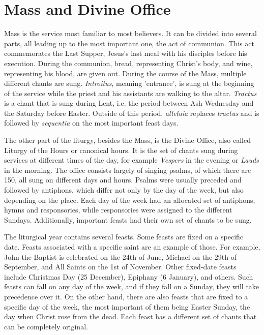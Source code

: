 \section{Mass and Divine Office}

Mass is the service most familiar to most believers.
It can be divided into several parts, all leading up to the most important one, the act of communion. This act commemorates the Last Supper,
Jesus's last meal with his disciples before his execution. During the communion, bread, representing Christ's body, and wine, representing his
blood, are given out. During the course of the Mass, multiple different chants are sung. \emph{Introitus}, meaning 'entrance', is sung at the beginning
of the service while the priest and his assistants are walking to the altar. \emph{Tractus} is a chant that is sung during Lent, i.e. the period
between Ash Wednesday and the Saturday before Easter. Outside of this period, \emph{alleluia} replaces \emph{tractus} and is followed by \emph{sequentia}
on the most important feast days.

The other part of the liturgy, besides the Mass, is the Divine Office, also called Liturgy of the Hours or canonical hours. It is the set of chants
sung during services at different times of the day, for example \emph{Vespers} in the evening or \emph{Lauds} in the morning. The office consists
largely of singing psalms, of which there are 150, all sung on different days and hours. Psalms were usually preceded and followed by antiphons,
which differ not only by the day of the week, but also depending on the place. Each day of the week had an allocated set of antiphons, hymns and
responsories, while responsories were assigned to the different Sundays. Additionally, important feasts had their own set of chants to be sung.

The liturgical year contains several feasts. Some feasts are fixed on a specific date. Feasts associated with a specific saint are an example of those.
For example, John the Baptist is celebrated on the 24th of June, Michael on the 29th of September, and All Saints on the 1st of November. Other
fixed-date feasts include Christmas Day (25 December), Epiphany (6 January), and others. Such feasts can fall on any day of the week, and if they fall
on a Sunday, they will take precedence over it. On the other hand, there are also feasts that are fixed to a specific day of the week, the most important
of them being Easter Sunday, the day when Christ rose from the dead. Each feast has a different set of chants that can be completely original.

